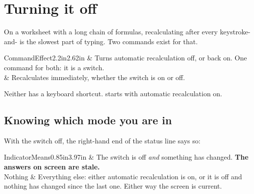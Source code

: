 \section{Turning it off}

On a worksheet with a long chain of formulas, recalculating after every
keystroke-and- is the slowest part of typing. Two commands exist for
that.

\begin{cctable}{Command}{Effect}{2.2in}{2.62in}
 & Turns automatic recalculation off, or back on.
One command for both: it is a switch. \\
 & Recalculates immediately, whether the switch is
on or off. \\
\end{cctable}

Neither has a keyboard shortcut. \ccprod{} starts with automatic recalculation
on.

\subsection{Knowing which mode you are in}

With the switch off, the right-hand end of the status line says so:

\begin{ccfigure}
\caption{Manual recalculation, with an answer on screen that is out of date}
\label{fig:recalcind}
\end{ccfigure}

\begin{cctable}{Indicator}{Means}{0.85in}{3.97in}
 & The switch is off \emph{and} something has changed. \textbf{The
answers on screen are stale.} \\
Nothing & Everything else: either automatic recalculation is on, or it is off
and nothing has changed since the last one. Either way the screen is
current. \\
\end{cctable}

